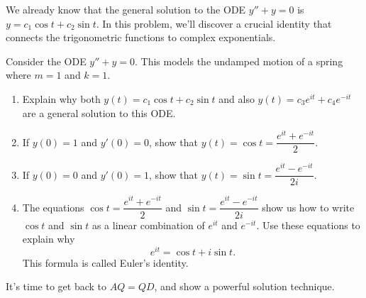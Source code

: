 We already know that the general solution to the ODE $y''+y=0$ is $y=c_1\cos t+c_2\sin t$. In this problem, we'll discover a crucial identity that connects the trigonometric functions to complex exponentials.

\begin{problem}
 Consider the ODE $y''+y=0$. This models the undamped motion of a spring where $m=1$ and $k=1$.    
\begin{enumerate}
 \item Explain why both $y(t) = c_1\cos t+c_2\sin t$ and also $y(t) = c_3 e^{it}+c_4e^{-it}$ are a general solution to this ODE.
 \item If $y(0)=1$ and $y'(0)=0$, show that $y(t)=\cos t=\dfrac{e^{it}+e^{-it}}{2}$.
 \item If $y(0)=0$ and $y'(0)=1$, show that $y(t)=\sin t=\dfrac{e^{it}-e^{-it}}{2i}$.
 \item The equations $\cos t=\dfrac{e^{it}+e^{-it}}{2}$ and $\sin t=\dfrac{e^{it}-e^{-it}}{2i}$ show us how to write $\cos t$ and $\sin t$ as a linear combination of $e^{it}$ and $e^{-it}$. Use these equations to explain why $$e^{it} = \cos t+i\sin t.$$ 
This formula is called Euler's identity. 
\end{enumerate}

\end{problem}










It's time to get back to $AQ=QD$, and show a powerful solution technique. 

